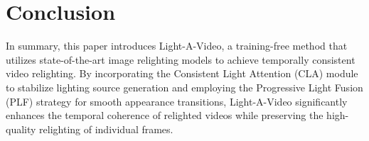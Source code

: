 \vspace{-0.5em}
\section{Conclusion}
\label{sec:conclusion}
\vspace{-0.5em}
In summary, this paper introduces Light-A-Video, 
a training-free method that utilizes state-of-the-art image relighting models 
to achieve temporally consistent video relighting.
By incorporating the Consistent Light Attention (CLA) module to stabilize lighting source generation and 
employing the Progressive Light Fusion (PLF) strategy for smooth appearance transitions, 
Light-A-Video significantly enhances the temporal coherence of relighted videos 
while preserving the high-quality relighting of individual frames.


